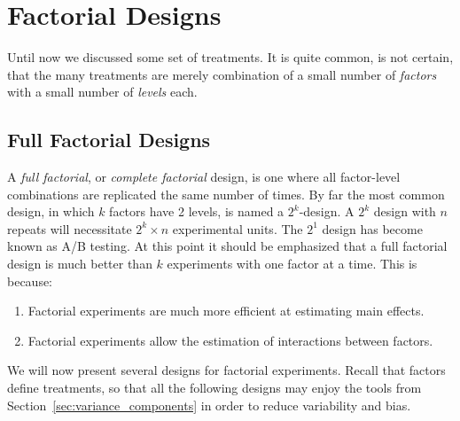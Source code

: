 \section{Factorial Designs}
Until now we discussed some set of treatments. 
It is quite common, is not certain, that the many treatments are merely combination of a small number of \emph{factors} with a small number of \emph{levels} each.



\subsection{Full Factorial Designs}
A \emph{full factorial}, or \emph{complete factorial} design, is one where all factor-level combinations are replicated the same number of times.
By far the most common design, in which $k$ factors have 2 levels, is named a $2^k$-design.
A $2^k$ design with $n$ repeats will necessitate $2^k\times n$ experimental units.
The $2^1$ design has become known as A/B testing.
At this point it should be emphasized that a full factorial design is much better than $k$ experiments with one factor at a time. This is because:
\begin{enumerate}
\item Factorial experiments are much more efficient at estimating main effects.
\item Factorial experiments allow the estimation of interactions between factors. 
\end{enumerate}


We will now present several designs for factorial experiments.
Recall that factors define treatments, so that all the following designs may enjoy the tools from Section~\ref{sec:variance_components} in order to reduce variability and bias. 

